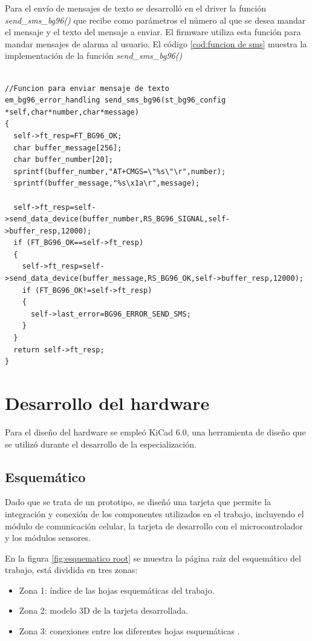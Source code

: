 Para el envío de mensajes de texto se desarrolló en el driver la función \emph{send\_sms\_bg96()} que recibe como parámetros el número al que se desea mandar el mensaje y el texto del mensaje a enviar. El firmware utiliza esta función para mandar mensajes de alarma al usuario.
El código \ref{cod:funcion de sms} muestra la implementación de la función \emph{send\_sms\_bg96()}
\begin{lstlisting}[label=cod:funcion de sms,caption=Función para enviar SMS.]  % Start your code-block

//Funcion para enviar mensaje de texto 
em_bg96_error_handling send_sms_bg96(st_bg96_config *self,char*number,char*message)
{
  self->ft_resp=FT_BG96_OK;
  char buffer_message[256];
  char buffer_number[20];
  sprintf(buffer_number,"AT+CMGS=\"%s\"\r",number);
  sprintf(buffer_message,"%s\x1a\r",message);
  
  self->ft_resp=self->send_data_device(buffer_number,RS_BG96_SIGNAL,self->buffer_resp,12000);
  if (FT_BG96_OK==self->ft_resp)
  {
    self->ft_resp=self->send_data_device(buffer_message,RS_BG96_OK,self->buffer_resp,12000);
    if (FT_BG96_OK!=self->ft_resp)
    {
      self->last_error=BG96_ERROR_SEND_SMS;
    }
  }
  return self->ft_resp;
}
\end{lstlisting}

\section{Desarrollo del hardware}

Para el diseño del hardware se empleó KiCad 6.0, una herramienta de diseño que se utilizó durante el desarrollo de la especialización.

\subsection{Esquemático} 
Dado que se trata de un prototipo, se diseñó una tarjeta que permite la integración y conexión de los componentes utilizados en el trabajo, incluyendo el módulo de comunicación celular, la tarjeta de desarrollo con el microcontrolador y los módulos sensores.

En la figura \ref{fig:esquematico root} se muestra la página raíz del esquemático del trabajo, está dividida en tres zonas:
\begin{itemize}
  \item Zona 1: índice de las hojas esquemáticas del trabajo.
  \item Zona 2: modelo 3D de la tarjeta desarrollada.
  \item Zona 3: conexiones entre los diferentes hojas esquemáticas .
\end{itemize}


